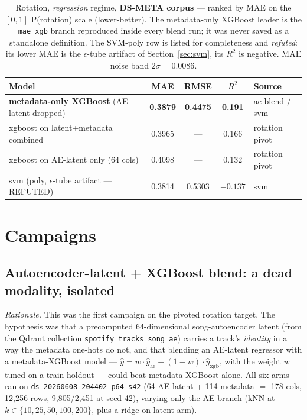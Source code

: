 \documentclass[11pt]{article}
\newcommand{\dsid}[1]{\texttt{\small #1}}
\newcommand{\best}[1]{\textbf{#1}}
\newcommand{\rsq}{$R^2$}
\begin{document}
\begin{table}[ht]
  \centering
  \caption{Rotation, \emph{regression} regime, \textbf{DS-META corpus} ---
  ranked by MAE on the $[0,1]$ P(rotation) scale (lower-better). The
  metadata-only XGBoost leader is the \texttt{mae\_xgb} branch reproduced
  inside every blend run; it was never saved as a standalone definition. The
  SVM-poly row is listed for completeness and \emph{refuted}: its lower MAE is
  the $\epsilon$-tube artifact of Section~\ref{sec:svm}, its \rsq{} is
  negative. MAE noise band $2\sigma=0.0086$.}
  \label{tab:lb-mae}
  \begin{tabular}{lcccl}
    \toprule
    Model & MAE & RMSE & \rsq{} & Source \\
    \midrule
    \best{metadata-only XGBoost} (AE latent dropped) & \best{0.3879} & \best{0.4475} & \best{0.191} & ae-blend / svm \\
    xgboost on latent+metadata combined              & 0.3965 & --- & 0.166 & rotation pivot \\
    xgboost on AE-latent only (64 cols)              & 0.4098 & --- & 0.132 & rotation pivot \\
    svm (poly, $\epsilon$-tube artifact --- REFUTED) & 0.3814 & 0.5303 & $-0.137$ & svm \\
    \bottomrule
  \end{tabular}
\end{table}

\section{Campaigns}

\subsection{Autoencoder-latent + XGBoost blend: a dead modality, isolated}
\label{sec:ae-blend}
\emph{Rationale.} This was the first campaign on the pivoted rotation target.
The hypothesis was that a precomputed 64-dimensional song-autoencoder latent
(from the Qdrant collection \texttt{spotify\_tracks\_song\_ae}) carries a
track's \emph{identity} in a way the metadata one-hots do not, and that
blending an AE-latent regressor with a metadata-XGBoost model ---
$\hat{y}=w\cdot\hat{y}_{\text{ae}}+(1-w)\cdot\hat{y}_{\text{xgb}}$, with the
weight $w$ tuned on a train holdout --- could beat metadata-XGBoost alone. All
six arms ran on \dsid{ds-20260608-204402-p64-s42} (64 AE latent + 114 metadata
$=$ 178 cols, 12{,}256 rows, 9{,}805/2{,}451 at seed 42), varying only the AE
branch (kNN at $k\in\{10,25,50,100,200\}$, plus a ridge-on-latent arm).
\end{document}
